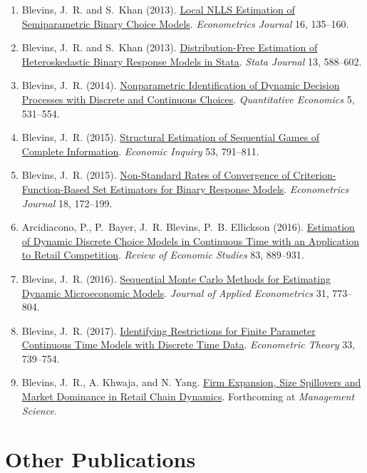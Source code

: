 \documentclass[10pt,letterpaper]{article}
\begin{document}
\begin{enumerate}
\item Blevins, J.~R. and S.~Khan (2013).
  \href{https://jblevins.org/research/lnlls}{Local NLLS Estimation of Semiparametric Binary Choice Models}.
  \textit{Econometrics Journal} 16, 135--160.
\item Blevins, J.~R. and S.~Khan (2013).
  \href{https://jblevins.org/research/dfbr/}{Distribution-Free Estimation of Heteroskedastic Binary Response Models in Stata}.
  \textit{Stata Journal} 13, 588--602.
\item Blevins, J.~R. (2014).
  \href{https://jblevins.org/research/dcident}{Nonparametric Identification of Dynamic Decision Processes with Discrete and Continuous Choices}.
  \textit{Quantitative Economics} 5, 531--554.
\item Blevins, J.~R. (2015).
  \href{https://jblevins.org/research/seqgame}{Structural Estimation of Sequential Games of Complete Information}.
  \textit{Economic Inquiry} 53, 791--811.
\item Blevins, J.~R. (2015).
  \href{https://jblevins.org/research/cuberoot}{Non-Standard Rates of Convergence of Criterion-Function-Based Set Estimators for Binary Response Models}.
  \textit{Econometrics Journal} 18, 172--199.
\item Arcidiacono, P., P.~Bayer, J.~R. Blevins, P.~B. Ellickson (2016).
  \href{https://jblevins.org/research/abbe}{Estimation of Dynamic Discrete Choice Models in Continuous Time with an Application to Retail Competition}.
  \textit{Review of Economic Studies} 83, 889--931.
\item Blevins, J.~R. (2016).
  \href{https://jblevins.org/research/smcdmm}{Sequential Monte Carlo Methods for Estimating Dynamic Microeconomic Models}.
  \textit{Journal of Applied Econometrics} 31, 773--804.
\item Blevins, J.~R. (2017).
  \href{https://jblevins.org/research/sde}{Identifying Restrictions for Finite Parameter Continuous Time Models with Discrete Time Data}.
  \textit{Econometric Theory} 33, 739--754.
\item Blevins, J.~R., A. Khwaja, and N. Yang.
  \href{https://jblevins.org/research/bky}{Firm Expansion, Size Spillovers and Market Dominance in Retail Chain Dynamics}.
  Forthcoming at \textit{Management Science}.
\end{enumerate}

\section*{Other Publications}
\end{document}
